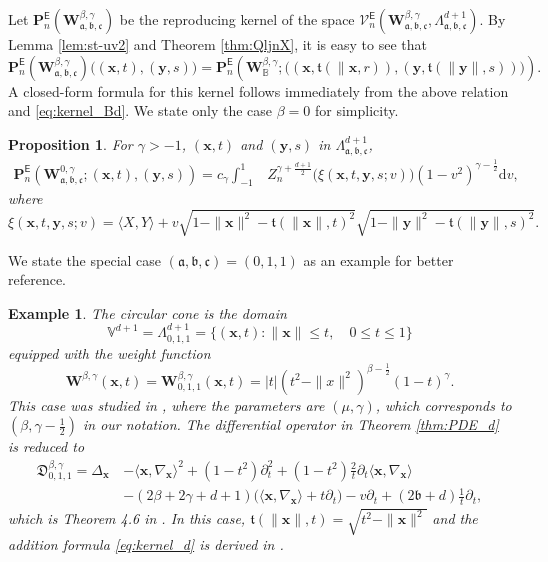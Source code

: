 \documentclass{amsart}
\newtheorem{prop}[thm]{Proposition}
\newtheorem{exam}[thm]{Example}
\theoremstyle{remark}
\def\la{{\langle}}
\def\ra{{\rangle}}
\def\d{\mathrm{d}}
\def\sE{{\mathsf E}}
\def\fa{{\mathfrak a}}
\def\fb{{\mathfrak b}}
\def\fc{{\mathfrak c}}
\def\ft{{\mathfrak t}}
\def\fD{{\mathfrak D}}
\def\b{{\beta}}
\def\g{{\gamma}}
\def\la{{\langle}}
\def\ra{{\rangle}}
\def\xb{{\mathbf x}}
\def\yb{{\mathbf y}}
\def\Pb{{\mathbf P}}
\def\Wb{{\mathbf W}}
\def\CV{{\mathcal V}}
\def\BB{{\mathbb B}}
\def\VV{{\mathbb V}}
\def\f{\frac}
\begin{document}
Let $\Pb_n^\sE(\Wb_{\fa,\fb,\fc}^{\b,\g})$ be the reproducing kernel of the space 
$\CV_n^\sE(\Wb_{\fa,\fb,\fc}^{\b,\g}, \Lambda_{\fa,\fb,\fc}^{d+1})$. By Lemma \ref{lem:st-uv2} and Theorem \ref{thm:QljnX},
it is easy to see that 
\begin{equation}\label{eq:ker=kerB}
   \Pb_n^\sE(\Wb_{\fa,\fb,\fc}^{\b,\g})\big((\xb,t), (\yb,s)\big) 
      =  \Pb_n^\sE\left(\Wb_\BB^{\b,\g}; \big( (\xb,\ft(\|\xb,r)), (\yb,\ft(\|\yb\|,s))\big)\right).  
\end{equation} 
A closed-form formula for this kernel follows immediately from the above relation and \eqref{eq:kernel_Bd}. We state
only the case $\b =0$ for simplicity. 

\begin{prop}
For $\g > -1$, $(\xb, t)$ and $(\yb,s)$ in $\Lambda_{\fa,\fb,\fc}^{d+1}$, 
\begin{align}\label{eq:kernel_d}
    \Pb_n^\sE \left(\Wb_{\fa,\fb,\fc}^{0,\g}; (\xb,t), (\yb,s) \right) = c_\g \int_{-1}^1  
       & Z_n^{\g+\frac{d+1}{2}} \big (\xi(\xb,t, \yb,s; v)\big) (1-v^2)^{\g-\f12} \d v,
\end{align}
where 
$$
 \xi(\xb,t, \yb,s; v) = \la X, Y \ra + v \sqrt{1-\|\xb\|^2 - \ft(\|\xb\|, t)^2}  \sqrt{1-\|\yb\|^2-\ft(\|\yb\|,s)^2}. 
$$
\end{prop}

We state the special case $(\fa,\fb,\fc) = (0,1,1)$ as an example for better reference. 
\begin{exam} \label{ex:cone}
 The circular cone is the domain 
$$
   \VV^{d+1}=  \Lambda_{0,1,1}^{d+1} = \{(\xb,t): \|\xb\| \le t, \quad 0 \le t \le 1\} 
$$
equipped with the weight function  
$$
   \Wb^{\b,\g}(\xb,t) = \Wb^{\b,\g}_{0,1,1} (\xb,t) = |t| (t^2-\|x\|^2)^{\b-\f12} (1-t)^\g.
$$
This case was studied in \cite{X21a}, where the parameters are $(\mu, \g)$, which corresponds to 
$(\b, \g-\f12)$ in our notation. The differential operator in Theorem \ref{thm:PDE_d} is reduced to 
\begin{align*}
 \fD_{0,1,1}^{\b,\g}  = \Delta_\xb\, & - \la \xb,\nabla_\xb\ra^2  + (1- t^2) \partial_t^2 
         +(1- t^2) \frac{2}{t} \partial_t  \la \xb,\nabla_\xb\ra \\   
     &   -(2\b+2\g+d+1) \big(\la \xb,\nabla_\xb\ra + t \partial_t \big) -v \partial_t  +(2 \fb + d) \frac{1}{t} \partial_t,
\end{align*}
which is Theorem 4.6 in \cite{X21a}. In this case, $\ft(\|\xb\|,t) = \sqrt{t^2 - \|\xb\|^2}$ and the addition formula 
\eqref{eq:kernel_d} is derived in \cite[Theorem 5.5]{X21a}.
\end{exam}
 
\end{document}
